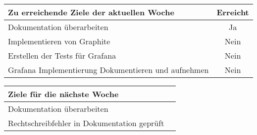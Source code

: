 \begin{tabularx}{\textwidth}{Xc}
    \arrayrulecolor{OliveGreen}
    \toprule
    {\bfseries Zu erreichende Ziele der aktuellen Woche} & {\bfseries Erreicht} \\
    \midrule[2pt]
    Dokumentation überarbeiten                              &Ja              \\
    \rowcolor{OliveGreen!15}
    Implementieren von Graphite                           &Nein              \\
    \rowcolor{White}
    Erstellen der Tests für Grafana                       &Nein              \\
    \rowcolor{OliveGreen!15}
    Grafana Implementierung Dokumentieren und aufnehmen   &Nein              \\
    \bottomrule[2pt]
\end{tabularx}
%
\vspace{1cm}
%
\begin{tabularx}{\textwidth}{Xc}
    \arrayrulecolor{OliveGreen}
    \toprule
    {\bfseries Ziele für die nächste Woche}        &                         \\
    \midrule[2pt]
    Dokumentation überarbeiten                     &                         \\
    \rowcolor{OliveGreen!15}
    Rechtschreibfehler in Dokumentation geprüft   &                          \\
\end{tabularx}
